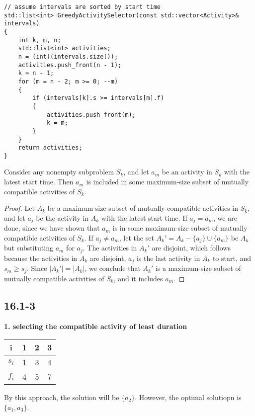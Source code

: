 \begin{verbatim}
// assume intervals are sorted by start time
std::list<int> GreedyActivitySelector(const std::vector<Activity>& intervals)
{
    int k, m, n;
    std::list<int> activities;
    n = (int)(intervals.size());
    activities.push_front(n - 1);
    k = n - 1;
    for (m = n - 2; m >= 0; --m)
    {
        if (intervals[k].s >= intervals[m].f)
        {
            activities.push_front(m);
            k = m;
        }
    }
    return activities;
}
\end{verbatim}

\begin{claim}
    Consider any nonempty subproblem $S_k$, 
    and let $a_m$ be an activity in $S_k$ with the latest start time.
    Then $a_m$ is included in some maximum-size subset of 
    mutually compatible activities of $S_k$.
\end{claim}

\begin{proof}
    Let $A_k$ be a maximum-size subset of mutually compatible activities in $S_k$,
    and let $a_j$ be the activity in $A_k$ with the latest start time.
    If $a_j = a_m$, we are done, since we have shown that
    $a_m$ is in some maximum-size subset of mutually compatible activities of $S_k$.
    If $a_j \neq a_m$, let the set $A_k' = A_k - \{ a_j \} \cup \{ a_m \}$ be $A_k$
    but substituting $a_m$ for $a_j$. 
    The activities in $A_k'$ are disjoint, which follows because
    the activities in $A_k$ are disjoint, $a_j$ is the last activity in $A_k$
    to start, and $s_m \geq s_j$.
    Since $|A_k'| = |A_k|$, we conclude that $A_k'$ is a maximum-size subset
    of mutually compatible activities of $S_k$, and it includes $a_m$.
\end{proof}

\subsection*{16.1-3}

\textbf{1. selecting the compatible activity of least duration}

\begin{tabular}{c|ccc}
    i & 1 & 2 & 3\\
    \hline
    $s_i$ & 1 & 3 & 4 \\
    $f_i$ & 4 & 5 & 7 \\
\end{tabular}

By this approach, the solution will be $\{ a_2 \}$.
However, the optimal solutiopn is $\{ a_1, a_3 \}$.

